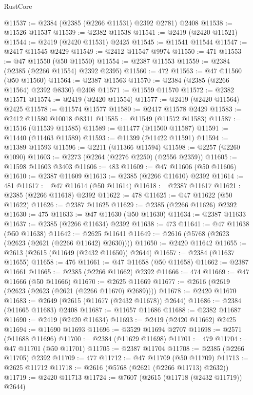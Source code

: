 \begin{lexlean}{RustCore}
\begin{coremodule}
@11537 := @2384 (@2385 (@2266 @11531) @2392 @2781) @2408
@11538 := @11526 @11537
@11539 := @2382 @11538
@11541 := @2419 (@2420 @11521)
@11544 := @2419 (@2420 @11531) @2425
@11545 := @11541 @11544
@11547 := @2417 @11545 @2429
@11549 := @2412 @11547 @9974
@11550 := 471
@11553 := @47 @11550 (@50 @11550)
@11554 := @2387 @11553
@11559 := @2384 (@2385 (@2266 @11554) @2392 @2395)
@11560 := 472
@11563 := @47 @11560 (@50 @11560)
@11564 := @2387 @11563
@11570 := @2384 (@2385 (@2266 @11564) @2392 @8330) @2408
@11571 := @11559 @11570
@11572 := @2382 @11571
@11574 := @2419 (@2420 @11554)
@11577 := @2419 (@2420 @11564) @2425
@11578 := @11574 @11577
@11580 := @2417 @11578 @2429
@11583 := @2412 @11580 @10018 @8311
@11585 := @11549 (@11572 @11583)
@11587 := @11516 (@11539 @11585)
@11589 := @11477 (@11500 @11587)
@11591 := @11440 (@11463 @11589)
@11593 := @11399 (@11422 @11591)
@11594 := @11389 @11593
@11596 := @2211 (@11366 @11594)
@11598 := @2257 (@2260 @1090)
@11603 := @2273 (@2264 (@2276 @2250) (@2556 @2359))
@11605 := @11598 @11603 @3403
@11606 := 483
@11609 := @47 @11606 (@50 @11606)
@11610 := @2387 @11609
@11613 := @2385 (@2266 @11610) @2392
@11614 := 481
@11617 := @47 @11614 (@50 @11614)
@11618 := @2387 @11617
@11621 := @2385 (@2266 @11618) @2392
@11622 := 478
@11625 := @47 @11622 (@50 @11622)
@11626 := @2387 @11625
@11629 := @2385 (@2266 @11626) @2392
@11630 := 475
@11633 := @47 @11630 (@50 @11630)
@11634 := @2387 @11633
@11637 := @2385 (@2266 @11634) @2392
@11638 := 473
@11641 := @47 @11638 (@50 @11638)
@11642 := @2625 @11641
@11649 := @2616 (@5768 (@2623 (@2623 (@2621 (@2266 @11642) @2630))))
@11650 := @2420 @11642
@11655 := @2613 (@2615 (@11649 (@2432 @11650)) @2644)
@11657 := @2384 (@11637 @11655)
@11658 := 476
@11661 := @47 @11658 (@50 @11658)
@11662 := @2387 @11661
@11665 := @2385 (@2266 @11662) @2392
@11666 := 474
@11669 := @47 @11666 (@50 @11666)
@11670 := @2625 @11669
@11677 := @2616 (@2619 (@2623 (@2623 (@2621 (@2266 @11670) @2689))))
@11678 := @2420 @11670
@11683 := @2649 (@2615 (@11677 (@2432 @11678)) @2644)
@11686 := @2384 (@11665 @11683) @2408
@11687 := @11657 @11686
@11688 := @2382 @11687
@11690 := @2419 (@2420 @11634)
@11693 := @2419 (@2420 @11662) @2425
@11694 := @11690 @11693
@11696 := @3529 @11694 @2707
@11698 := @2571 (@11688 @11696)
@11700 := @2384 (@11629 @11698)
@11701 := 479
@11704 := @47 @11701 (@50 @11701)
@11705 := @2387 @11704
@11708 := @2385 (@2266 @11705) @2392
@11709 := 477
@11712 := @47 @11709 (@50 @11709)
@11713 := @2625 @11712
@11718 := @2616 (@5768 (@2621 (@2266 @11713) @2632))
@11719 := @2420 @11713
@11724 := @7607 (@2615 (@11718 (@2432 @11719)) @2644)

\end{coremodule}
\end{lexlean}
